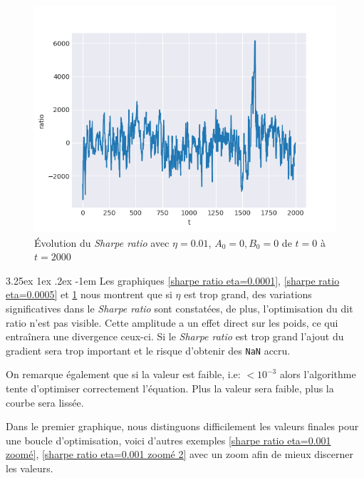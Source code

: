 \documentclass[a4paper, 11pt]{article}
\makeatletter
\renewcommand\paragraph{\@startsection{paragraph}{5}{\z@}%
  {3.25ex \@plus1ex \@minus.2ex}%
  {-1em}%
  {\normalfont\normalsize\bfseries}}
\makeatother
\begin{document}
 \begin{figure}[H]
 	\centering
 	\includegraphics[]{res/exemple_eta_too_big}
 	\caption[Blup]{Évolution du \textit{Sharpe ratio} avec $\eta = 0.01$, $A_0 = 0, B_0 = 0$ de $t=0$ à $t=2000$}
	\label{sharpe ratio eta=0.01}
 \end{figure}
 
 \paragraph{}
 Les graphiques \ref{sharpe ratio eta=0.0001}, \ref{sharpe ratio eta=0.0005} et \ref{sharpe ratio eta=0.01} nous montrent que si $\eta$ est trop grand, des variations significatives dans le \textit{Sharpe ratio} sont constatées, de plus, l'optimisation du dit ratio n'est pas visible. Cette amplitude a un effet direct sur les poids, ce qui entraînera une divergence ceux-ci. Si le \textit{Sharpe ratio} est trop grand
 l'ajout du gradient sera trop important et le risque d'obtenir des \texttt{NaN} accru.
 
 On remarque également que si la valeur est faible, i.e: $< 10^{-3}$ alors l'algorithme tente d'optimiser correctement l'équation. Plus la valeur sera faible,
 plus la courbe sera lissée.
 
 Dans le premier graphique, nous distinguons difficilement les valeurs finales pour une boucle d'optimisation, voici d'autres exemples \ref{sharpe ratio eta=0.001 zoomé}, \ref{sharpe ratio eta=0.001 zoomé 2} avec un zoom afin de mieux discerner les valeurs.
 
\end{document}

